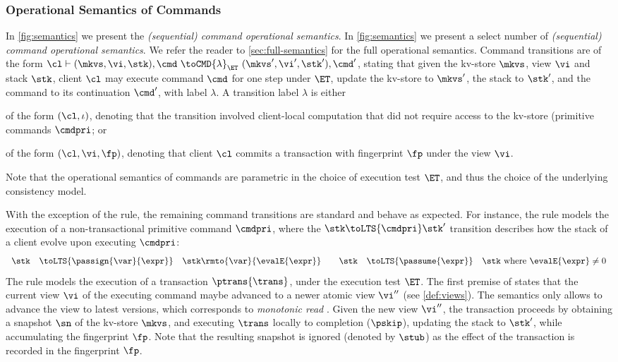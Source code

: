 \subsubsection{Operational Semantics of Commands}
\ifTechReport%
In \cref{fig:semantics} we present the \emph{(sequential) command operational semantics}.
\else%
In \cref{fig:semantics} we present a select number of \emph{(sequential) command operational semantics}.
We refer the reader to \cref{sec:full-semantics} for the full operational semantics.
\fi%
Command transitions are of the form $\cl \vdash (\mkvs, \vi, \stk), \cmd \ \toCMD{\lambda}_{\ET} \ (\mkvs', \vi', \stk') , \cmd'$, 
stating that given the kv-store $\mkvs$, view $\vi$ and stack $\stk$, client $\cl$ may execute command $\cmd$ for one step under $\ET$, update the kv-store to $\mkvs'$, the stack to $\stk'$, and the command to its continuation $\cmd'$, with label $\lambda$.
A transition label $\lambda$ is either
\begin{enumerate*}
	\item of the form $(\cl, \iota)$, denoting that the transition involved 
client-local computation that did not require access to the kv-store (\eg primitive commands $\cmdpri$; or
	\item of the form $(\cl, \vi, \fp)$, denoting that client $\cl$ commits a transaction with fingerprint $\fp$ under the view $\vi$.
\end{enumerate*}
Note that the operational semantics of commands are parametric in the choice of execution test $\ET$, 
and thus the choice of the underlying consistency model.


With the exception of the  rule, the remaining command transitions are standard and behave as expected. 
For instance, the  rule models the execution of a non-transactional primitive command $\cmdpri$, where the $\stk \toLTS{\cmdpri} \stk'$ transition describes how the stack of a client 
evolve upon executing $\cmdpri$:
\[
\begin{array}{rcl @{\qquad} rcl}
\stk  & \toLTS{\passign{\var}{\expr}} & \stk\rmto{\var}{\evalE{\expr}} &
\stk  & \toLTS{\passume{\expr}} & \stk \text{ where } \evalE{\expr} \neq 0 \\
\end{array}                                                                                               
\]
%
%
The  rule models the execution of a transaction $\ptrans{\trans}$, under the execution test $\ET$. 
The first premise of  states that the current view $\vi$ of the executing command maybe advanced to a newer atomic view $\vi''$ (see \cref{def:views}). 
The semantics only allows to advance the view to latest versions, which corresponds to \emph{monotonic read} \cite{.......}.
Given the new view $\vi''$, the transaction proceeds by obtaining a snapshot $\sn$ of the kv-store $\mkvs$, and executing $\trans$ locally to completion ($\pskip$), updating the stack to $\stk'$, while accumulating the fingerprint $\fp$. Note that the resulting snapshot is ignored (denoted by $\stub$) as the effect of the transaction is recorded in the fingerprint $\fp$. 
%

